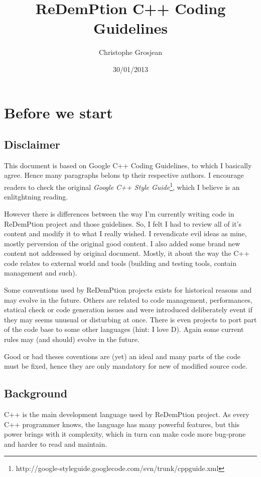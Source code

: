 \documentclass[11pt]{report}
\title{\textbf{ReDemPtion C++ Coding Guidelines}}
\author{Christophe Grosjean}
\date{30/01/2013}
\begin{document}
\maketitle

\chapter{Before we start}

\section{Disclaimer}

This document is based on Google C++ Coding Guidelines, to which I basically agree. Hence many paragraphs belons tp their respective authors. I encourage readers to check the original \emph{Google C++ Style Guide}\footnote{http://google-styleguide.googlecode.com/svn/trunk/cppguide.xml}, which I believe is an enlitghtning reading.

However there is differences between the way I'm currently writing code in ReDemPtion project and those guidelines. So, I felt I had to review all of it's content and modify it to what I really wished. I revendicate evil ideas as mine, mostly perversion of the original good content. I also added some brand new content not addressed by original document. Mostly, it about the way the C++ code relates to external world and tools (building and testing tools, contain management and such).

Some conventions used by ReDemPtion projects exists for historical reasons and may evolve in the future. Others are related to code management, performances, statical check or code generation issues and were introduced deliberately event if they may seems unusual or disturbing at once. There is even projects to port part of the code base to some other languages (hint: I love D). Again some current rules may (and should) evolve in the future.

Good or bad theses coventions are (yet) an ideal and many parts of the code must be fixed, hence they are only mandatory for new of modified source code.


\section{Background}

C++ is the main development language used by ReDemPtion project. As every C++ programmer knows, the language has many powerful features, but this power brings with it complexity, which in turn can make code more bug-prone and harder to read and maintain.
\end{document}

